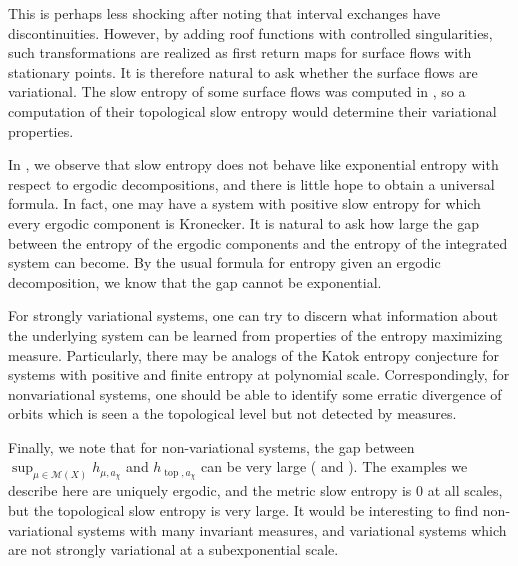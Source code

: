 \documentclass[oneside]{amsart}
\theoremstyle{plain}
\theoremstyle{definition}
\newcommand{\<}{\langle}
\renewcommand{\>}{\rangle}
\newcommand{\topo}{\operatorname{top}}
\renewcommand{\|}{|\!|} %
\begin{document}
This is perhaps less shocking after noting that interval exchanges have discontinuities. However, by adding roof functions with controlled singularities, such transformations are realized as first return maps for surface flows with stationary points. It is therefore natural to ask whether the surface flows are variational. The slow entropy of some surface flows was computed in \cite{SpecialFlows}, so a computation of their topological slow entropy would determine their variational properties.

In , we observe that slow entropy does not behave like exponential entropy with respect to ergodic decompositions, and there is little hope to obtain a universal formula. In fact, one may have a system with positive slow entropy for which every ergodic component is Kronecker. It is natural to ask how large the gap between the entropy of the ergodic components and the entropy of the integrated system can become. By the usual formula for entropy given an ergodic decomposition, we know that the gap cannot be exponential.

For strongly variational systems, one can try to discern what information about the underlying system can be learned from properties of the entropy maximizing measure. Particularly, there may be analogs of the Katok entropy conjecture for systems with positive and finite entropy at polynomial scale. Correspondingly, for nonvariational systems, one should be able to identify some erratic divergence of orbits which is seen a the topological level but not detected by measures.

Finally, we note that for non-variational systems, the gap between \\ $\sup_{\mu \in \mathcal M(X)} h_{\mu,a_\chi}$ and $h_{\topo,a_\chi}$ can be very large ( and ). The examples we describe here are uniquely ergodic, and the metric slow entropy is 0 at all scales, but the topological slow entropy is very large. It would be interesting to find non-variational systems with many invariant measures, and variational systems which are not strongly variational at a subexponential scale.
\end{document}

